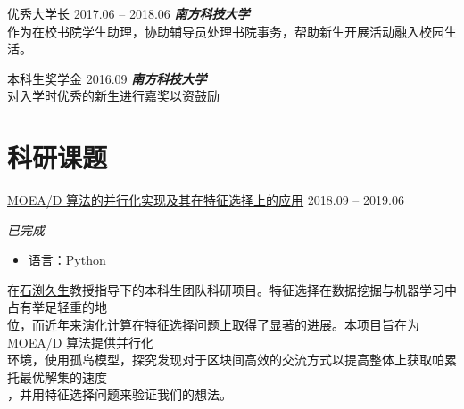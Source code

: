 \documentclass[hidelinks__VERSION__]{adamyi-cv}
\begin{document}
\begin{entrylist}


\entry
{\heir 优秀大学长}
{2017.06 -- 2018.06}
{\hei \emph{\textbf{\hei 南方科技大学}}\\
作为在校书院学生助理，协助辅导员处理书院事务，帮助新生开展活动融入校园生活。
}


\entry
{\heir 本科生奖学金}
{2016.09}
{\hei \emph{\textbf{\hei 南方科技大学}}\\
对入学时优秀的新生进行嘉奖以资鼓励
}


\end{entrylist}


\section{\heir 科研\heir 课题}

\begin{entrylist}


\entry
{\href{https://github.com/hackroid/pMOEA-D}{\heir MOEA/D 算法的并行化实现及其在特征选择上的应用}}
{2018.09 -- 2019.06}
{\emph{\hei 已完成}
\begin{itemize}
    \item \hei 语言：Python
\end{itemize}
{\hei
在\href{http://cse.sustech.edu.cn/en/people/view/people_id/55/sort_id/9/pid/}{\hei 石渕久生}教授指导下的本科生团队科研项目。特征选择在数据挖掘与机器学习中占有举足轻重的地\\
位，而近年来演化计算在特征选择问题上取得了显著的进展。本项目旨在为 MOEA/D 算法提供并行化\\
环境，使用孤岛模型，探究发现对于区块间高效的交流方式以提高整体上获取帕累托最优解集的速度\\
，并用特征选择问题来验证我们的想法。
}}



\end{entrylist}
\end{document}
